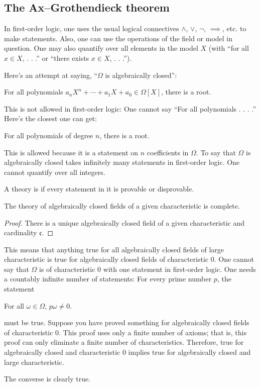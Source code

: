 \documentclass [11 pt, oneside, margin = 1 in] {article}
\begin{document}
\subsection{The Ax--Grothendieck theorem}
\begin{remark}
	 In first-order logic, one uses the usual logical connectives $\land$, $\lor$, $\lnot$, $\implies$, etc. to make statements. Also, one can use the operations of the field or model in question. One may also quantify over all elements in the model $X$ (with ``for all $x\in X$, . . .'' or ``there exists $x\in X$, . . .'').

	Here's an attempt at saying, ``$\Omega$ is algebraically closed'':
	\begin{center}
		\small For all polynomials $a_nX^n + \cdots + a_1X + a_0\in \Omega[X]$, there is a root.
	\end{center}
	This is not allowed in first-order logic: One cannot say ``For all polynomials . . . .'' Here's the closest one can get:
	\begin{center}
		\small For all polynomials of degree $n$, there is a root.
	\end{center}
	This is allowed because it is a statement on $n$ coefficients in $\Omega$. To say that $\Omega$ is algebraically closed takes infinitely many statements in first-order logic. One cannot quantify over all integers.
\end{remark}
\begin{definition}[ ]\label{}\text{}
A theory is  if every statement in it is provable or disprovable.
\end{definition}

\begin{proposition}[ ]\label{}\text{}
The theory of algebraically closed fields of a given characteristic is complete.
\end{proposition}

\begin{proof}
There is a unique algebraically closed field of a given characteristic and cardinality $\mathfrak{c}$.
\end{proof}

\begin{remark}
	This means that anything true for all algebraically closed fields of large characteristic is true for algebraically closed fields of characteristic $0$. One cannot say that $\Omega$ is of characteristic $0$ with one statement in first-order logic. One needs a countably infinite number of statements: For every prime number $p$, the statement
	\begin{center}
		\small For all $\omega\in \Omega$, $p\omega\ne 0$.
	\end{center}
	must be true. Suppose you have proved something for algebraically closed fields of characteristic $0$. This proof uses only a finite number of axioms; that is, this proof can only eliminate a finite number of characteristics. Therefore, true for algebraically closed and characteristic $0$ implies true for algebraically closed and large characteristic.

	The converse is clearly true.
\end{remark}
\end{document}
